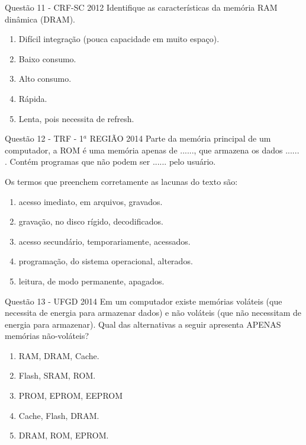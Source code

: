 \documentclass[aspectratio=169,
				xcolor=table]{beamer}
\begin{document}
	\begin{frame}{Questão 11 - CRF-SC 2012}
		Identifique as características da memória RAM dinâmica (DRAM). 
		
		\begin{enumerate}[I]
			\large
			\item Difícil integração (pouca capacidade em muito espaço). 
			\item Baixo consumo. 
			\item Alto consumo. 
			\item Rápida. 
			\item Lenta, pois necessita de refresh. 
		\end{enumerate}
	\end{frame}


	\begin{frame}{Questão 12 - TRF - 1${}^a$ REGIÃO 2014}
		Parte da memória principal de um computador, a ROM é uma memória apenas de ......, que armazena os dados ...... . Contém programas que não podem ser ...... pelo usuário.

		Os termos que preenchem corretamente as lacunas do texto são: 
			\begin{enumerate}[a]
				\item	acesso imediato, em arquivos, gravados. 
				\item	gravação, no disco rígido, decodificados. 
				\item	acesso secundário, temporariamente, acessados. 
				\item	programação, do sistema operacional, alterados.
				\item	leitura, de modo permanente, apagados.	
			\end{enumerate}
	\end{frame}
	
	\begin{frame}{Questão 13 - UFGD 2014}
		Em um computador existe memórias voláteis (que necessita de energia para armazenar dados) e não voláteis (que não necessitam de energia para armazenar). Qual das alternativas a seguir apresenta APENAS memórias não-voláteis?
		
		\begin{enumerate}[a]
			\item	RAM, DRAM, Cache.
			\item	Flash, SRAM, ROM.
			\item	PROM, EPROM, EEPROM
			\item	Cache, Flash, DRAM.
			\item	DRAM, ROM, EPROM.		
		\end{enumerate}
	\end{frame}
	
\end{document}
